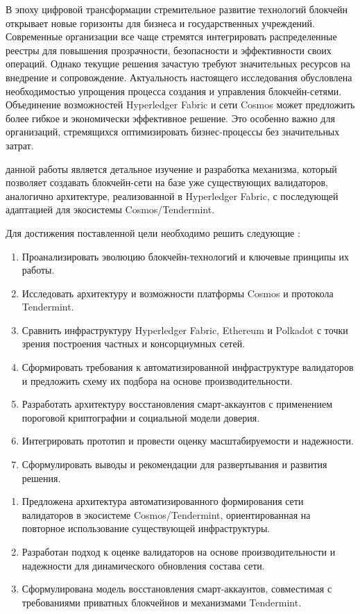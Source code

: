 {\actuality} В эпоху цифровой трансформации стремительное развитие технологий блокчейн
открывает новые горизонты для бизнеса и государственных учреждений. Современные
организации все чаще стремятся интегрировать распределенные реестры для повышения
прозрачности, безопасности и эффективности своих операций. Однако текущие решения
зачастую требуют значительных ресурсов на внедрение и сопровождение. Актуальность
настоящего исследования обусловлена необходимостью упрощения процесса создания и
управления блокчейн-сетями. Объединение возможностей Hyperledger Fabric и сети
Cosmos может предложить более гибкое и экономически эффективное решение. Это
особенно важно для организаций, стремящихся оптимизировать бизнес-процессы без
значительных затрат.

{\aim} данной работы является детальное изучение и разработка механизма, который
позволяет создавать блокчейн-сети на базе уже существующих валидаторов, аналогично
архитектуре, реализованной в Hyperledger Fabric, с последующей адаптацией для
экосистемы Cosmos/Tendermint.

Для достижения поставленной цели необходимо решить следующие {\tasks}:
\begin{enumerate}[beginpenalty=10000]
  \item Проанализировать эволюцию блокчейн-технологий и ключевые принципы их работы.
  \item Исследовать архитектуру и возможности платформы Cosmos и протокола Tendermint.
  \item Сравнить инфраструктуру Hyperledger Fabric, Ethereum и Polkadot с точки зрения
  построения частных и консорциумных сетей.
  \item Сформировать требования к автоматизированной инфраструктуре валидаторов и
  предложить схему их подбора на основе производительности.
  \item Разработать архитектуру восстановления смарт-аккаунтов с применением
  пороговой криптографии и социальной модели доверия.
  \item Интегрировать прототип и провести оценку масштабируемости и надежности.
  \item Сформулировать выводы и рекомендации для развертывания и развития решения.
\end{enumerate}

{\novelty}
\begin{enumerate}[beginpenalty=10000]
  \item Предложена архитектура автоматизированного формирования сети валидаторов
  в экосистеме Cosmos/Tendermint, ориентированная на повторное использование
  существующей инфраструктуры.
  \item Разработан подход к оценке валидаторов на основе производительности и
  надежности для динамического обновления состава сети.
  \item Сформулирована модель восстановления смарт-аккаунтов, совместимая с
  требованиями приватных блокчейнов и механизмами Tendermint.
\end{enumerate}

